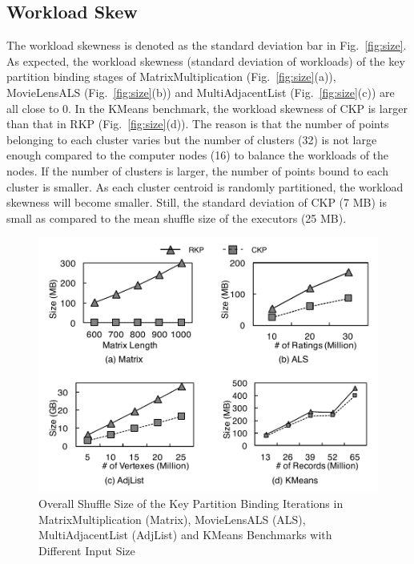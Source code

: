 \documentclass[10pt,journal,compsoc]{IEEEtran}
\begin{document}

\subsection{Workload Skew}
The workload skewness is denoted as the standard deviation bar in Fig.~\ref{fig:size}. 
As expected, the workload skewness (standard deviation of workloads) of the key partition 
binding stages of MatrixMultiplication (Fig.~\ref{fig:size}(a)), MovieLensALS (Fig.~\ref{fig:size}(b)) and MultiAdjacentList (Fig.~\ref{fig:size}(c)) are all close to 0. 
In the KMeans benchmark, the workload skewness of CKP is larger than that in RKP (Fig.~\ref{fig:size}(d)). 
The reason is that the number of points belonging to each cluster varies but the number of clusters (32) is not large enough compared to 
the computer nodes (16) to balance the workloads of the nodes. 
If the number of clusters is larger, 
the number of points bound to each cluster is smaller.
As each cluster centroid is randomly partitioned, the workload 
skewness will become smaller.
Still, the standard deviation of CKP (7 MB) is small as compared to the mean shuffle size of the executors (25 MB).



\begin{figure}[!t]
\centering
\includegraphics[width=1\columnwidth]{figure7}
\caption{Overall Shuffle Size of the Key Partition 
Binding Iterations in MatrixMultiplication (Matrix), MovieLensALS (ALS), MultiAdjacentList (AdjList) and KMeans Benchmarks with Different Input Size}
\label{fig:sizeLine}
\end{figure}
\end{document}
